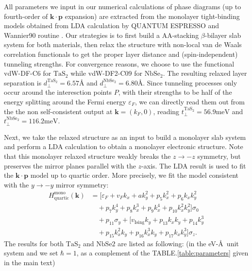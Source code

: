 \begin{subappendices}
	All parameters we input in our numerical calculations of phase diagrams (up to fourth-order of $\bm{k\cdot p}$ expansion) are extracted from the monolayer tight-binding models obtained from LDA calculation by QUANTUM ESPRESSO \cite{giannozzi2009quantum,giannozzi2017advanced} and Wannier90 routine \cite{pizzi2020wannier90}. Our strategies is to first build a AA-stacking $\beta$-bilayer slab system for both materials, then relax the structure with non-local van de Waals correlation functionals to get the proper layer distance and (spin-independent) tunneling strengths. For convergence reasons, we choose to use the functional vdW-DF-C6 \cite{tkatchenko2009accurate,berland2019van} for $\mathrm{TaS_2}$ while vdW-DF2-C09 \cite{lee2010higher,cooper2010van} for $\mathrm{NbSe_2}$. The resulting relaxed layer separation is $d_\perp^{\mathrm{TaS_2}}=6.57\text{\AA}$ and $d_\perp^{\mathrm{NbSe_2}}=6.80\text{\AA}$. Since tunneling processes only occur around the interesction points $P$, with their strengths to be half of the energy splitting around the Fermi energy $\varepsilon_F$, we can directly read them out from the the non self-consistent output at $\bm{k}=(k_F,0)$, reading $t_\perp^{\mathrm{TaS_2}}=56.9\mathrm{meV}$ and $t_\perp^{\mathrm{NbSe_2}}=116.2\mathrm{meV}$.\par
	Next, we take the relaxed structure as an input to build a monolayer slab system and perform a LDA calculation to obtain a monolayer electronic structure. Note that this monolayer relaxed structure weakly breaks the $z\rightarrow -z$ symmetry, but preserves the mirror planes parallel with the $z$-axis. The LDA result is used to fit the $\bm{k\cdot p}$ model up to quartic order. More precisely, we fit the model consistent with the $y\rightarrow -y$ mirror symmetry:
	\begin{align}\label{monolayer quartic kdotp expansion}
		H^{\text{mono}}_{\text{quartic}}(\bm{k})&=\bigg[\varepsilon_F +v_F k_x + a k_y^2 + p_5 k_x^2 + p_6 k_x k_y^2\nonumber\\
		&\quad + p_7 k_y^4 + p_8 k_x^3 + p_9 k_x^4 + p_{10} k_x^2 k_y^2\bigg]\sigma_0\nonumber\\
		&\quad + p_{11}\sigma_y +\bigg[ v_{\text{Ising}} k_y + p_{13} k_x k_y + p_{14} k_y^3\nonumber\\
		&\quad + p_{15} k_x^2 k_y + p_{16} k_x^3 k_y + p_{17} k_x k_y^3\bigg]\sigma_z.
	\end{align}
	The results for both $\mathrm{TaS_2}$ and $\mathrm{NbSe2}$ are listed as following: (in the eV-\AA~unit system and we set $\hbar=1$, as a complement of the TABLE.\ref{table:parameters} given in the main text)
	

\end{subappendices}
